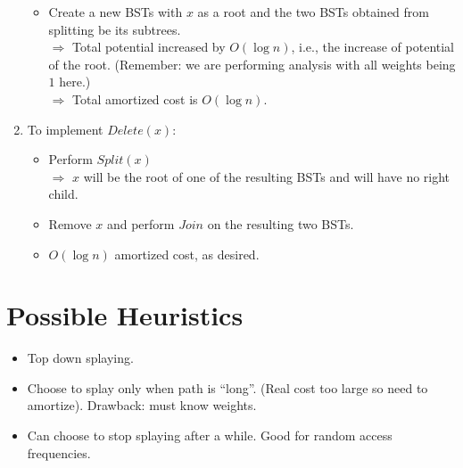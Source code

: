 \documentclass{article}
\begin{document}
\begin{enumerate}
\begin{itemize}
\item Create a new BSTs with $x$ as a root and the two BSTs obtained from splitting be its subtrees.\\
$\Rightarrow$ Total potential increased by $O(\log n)$, i.e., the increase of potential of the root. (Remember: we are performing analysis with all weights being $1$ here.)\\
$\Rightarrow$ Total amortized cost is $O(\log n)$. 
\end{itemize} 
\item To implement $Delete(x)$:
\begin{itemize}
\item Perform $Split(x)$\\
$\Rightarrow$ $x$ will be the root of one of the resulting BSTs and will have no right child.
\item Remove $x$ and perform $Join$ on the resulting two BSTs.
\item $O(\log n)$ amortized cost, as desired.
\end{itemize}
\end{enumerate}

\section{Possible Heuristics}

\begin{itemize}
\item Top down splaying.
\item Choose to splay only when path is ``long''. (Real cost too
  large so need to amortize).  Drawback: must know weights.
\item Can choose to stop splaying after a while. Good for random
  access frequencies.
\end{itemize}
\end{document}
